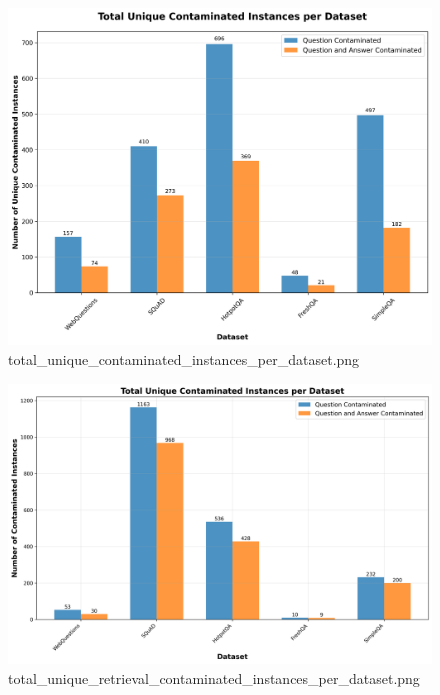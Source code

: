 \begin{figure}[htbp]
    \centering
    \includegraphics[width=\columnwidth]{res/total_unique_contaminated_instances_per_dataset.png}
    \caption{total\_unique\_contaminated\_instances\_per\_dataset.png}
    \label{fig:total_unique_contaminated_instances}
\end{figure}

\begin{figure}[htbp]
    \centering
    \includegraphics[width=\columnwidth]{res/total_unique_retrieval_contaminated_instances_per_dataset.png}
    \caption{total\_unique\_retrieval\_contaminated\_instances\_per\_dataset.png}
    \label{fig:total_unique_retrieval_contaminated_instances}
\end{figure}
